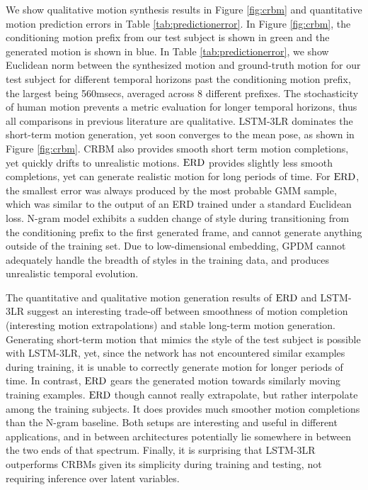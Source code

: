 \documentclass[10pt,twocolumn,letterpaper]{article}
\begin{document}
We show  qualitative motion synthesis results in Figure \ref{fig:crbm}  and  quantitative motion prediction errors in Table \ref{tab:predictionerror}.  In Figure \ref{fig:crbm},  the conditioning motion prefix from our test subject is shown in green  and the generated motion is shown in blue. 
In Table \ref{tab:predictionerror}, we show Euclidean norm between the synthesized motion  and ground-truth   motion for our test subject  for different temporal horizons past the conditioning motion prefix, the largest being 560msecs, averaged across 8 different prefixes. The stochasticity of human motion prevents a metric evaluation for longer temporal horizons, thus all comparisons in previous literature are qualitative.  
LSTM-3LR dominates the short-term motion generation, yet soon converges to the mean pose, as shown in Figure \ref{fig:crbm}. CRBM also provides smooth short term motion completions,  yet quickly drifts to unrealistic motions. $\text{ERD}$ provides slightly less smooth completions, yet can generate realistic  motion for long periods of time. For $\text{ERD}$, the smallest error was always produced by the most probable GMM sample, which was similar to the output of an ERD trained under a standard Euclidean loss. N-gram model exhibits a sudden change of style during transitioning from the conditioning prefix to the first generated frame, and cannot generate anything outside of the training set. Due to low-dimensional embedding, GPDM cannot adequately handle the breadth of styles in the training data, and produces unrealistic temporal evolution.  


The quantitative and qualitative motion generation results of $\text{ERD}$ and LSTM-3LR suggest an interesting trade-off between smoothness of motion completion (interesting motion extrapolations) and stable long-term motion generation. Generating short-term motion that mimics the style of the test subject is possible with LSTM-3LR, yet, since the network has not encountered similar  examples during  training, it is unable to correctly generate motion for longer periods of time. In contrast, $\text{ERD}$ gears the  generated motion towards similarly moving training examples. $\text{ERD}$  though cannot really extrapolate, but rather interpolate among the training subjects. It does   provides much smoother motion completions than the N-gram baseline. Both setups are interesting and useful in different applications, and in between architectures potentially lie somewhere in between the two ends of that spectrum. Finally, it is surprising that LSTM-3LR outperforms CRBMs given its simplicity during  training and testing, not requiring inference over latent variables. 
\end{document}
